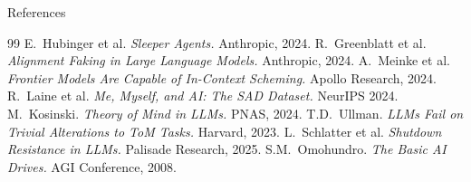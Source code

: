\documentclass[aspectratio=169, 12pt]{beamer}
\begin{document}
\begin{frame}[allowframebreaks]{References}
\begin{thebibliography}{99}
   E.\ Hubinger et al.
    \emph{Sleeper Agents.} Anthropic, 2024.
   R.\ Greenblatt et al.
    \emph{Alignment Faking in Large Language Models.} Anthropic, 2024.
   A.\ Meinke et al.
    \emph{Frontier Models Are Capable of In-Context Scheming.}
    Apollo Research, 2024.
   R.\ Laine et al.
    \emph{Me, Myself, and AI: The SAD Dataset.} NeurIPS 2024.
   M.\ Kosinski.
    \emph{Theory of Mind in LLMs.} PNAS, 2024.
   T.D.\ Ullman.
    \emph{LLMs Fail on Trivial Alterations to ToM Tasks.} Harvard, 2023.
   L.\ Schlatter et al.
    \emph{Shutdown Resistance in LLMs.} Palisade Research, 2025.
   S.M.\ Omohundro.
    \emph{The Basic AI Drives.} AGI Conference, 2008.

  \end{thebibliography}
\end{frame}
\end{document}
